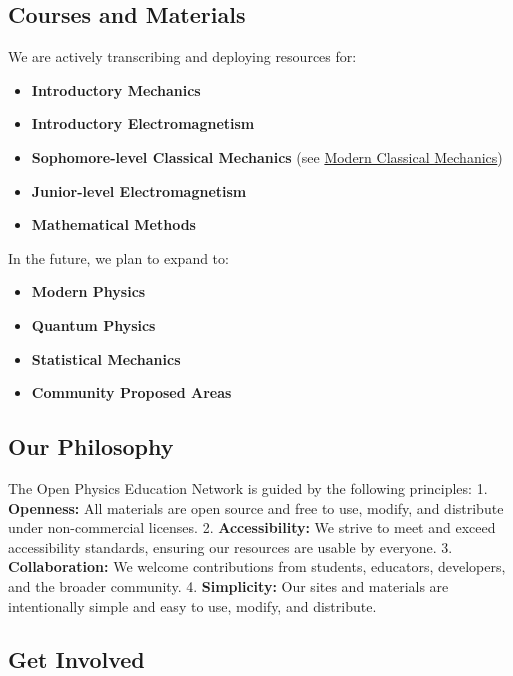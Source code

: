 \subsection{Courses and Materials}\label{courses-and-materials}

We are actively transcribing and deploying resources for:

\begin{itemize}
\tightlist
\item
  \textbf{Introductory Mechanics}
\item
  \textbf{Introductory Electromagnetism}
\item
  \textbf{Sophomore-level Classical Mechanics} (see
  \href{https://open-physics-ed-org.github.io/modern-classical-mechanics/}{Modern
  Classical Mechanics})
\item
  \textbf{Junior-level Electromagnetism}
\item
  \textbf{Mathematical Methods}
\end{itemize}

In the future, we plan to expand to:

\begin{itemize}
\tightlist
\item
  \textbf{Modern Physics}
\item
  \textbf{Quantum Physics}
\item
  \textbf{Statistical Mechanics}
\item
  \textbf{Community Proposed Areas}
\end{itemize}

\subsection{Our Philosophy}\label{our-philosophy}

The Open Physics Education Network is guided by the following
principles: 1. \textbf{Openness:} All materials are open source and free
to use, modify, and distribute under non-commercial licenses. 2.
\textbf{Accessibility:} We strive to meet and exceed accessibility
standards, ensuring our resources are usable by everyone. 3.
\textbf{Collaboration:} We welcome contributions from students,
educators, developers, and the broader community. 4.
\textbf{Simplicity:} Our sites and materials are intentionally simple
and easy to use, modify, and distribute.

\subsection{Get Involved}\label{get-involved}

